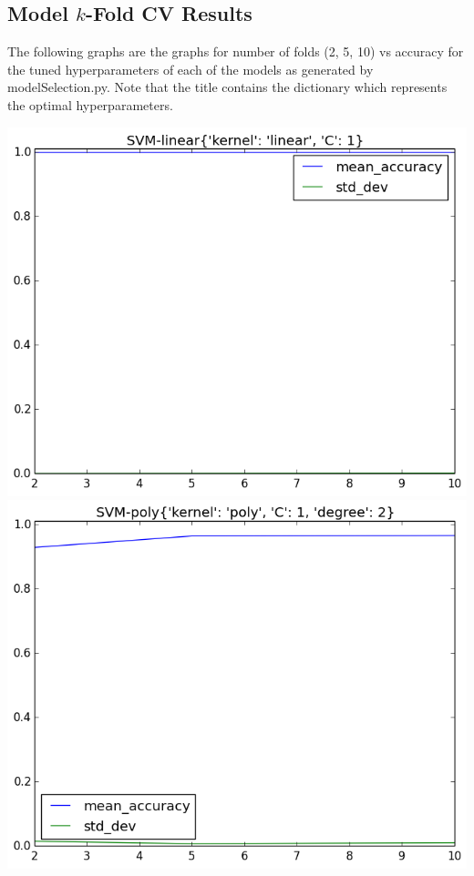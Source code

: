 \documentclass[fleqn]{article}
\begin{document}
    \subsection{Model $k$-Fold CV Results}

    The following graphs are the graphs for number of folds (2, 5, 10) vs accuracy for
    the tuned hyperparameters of each of the models as generated by modelSelection.py. Note
    that the title contains the dictionary which represents the optimal hyperparameters.

    \begin{center}
        \includegraphics[scale=0.3]{model_accuracy_vs_folds_SVM-linear.png}
        \includegraphics[scale=0.3]{model_accuracy_vs_folds_SVM-poly.png}

\end{center}
\end{document}
